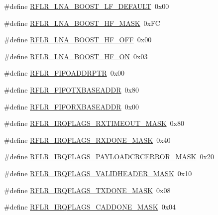 \begin{DoxyCompactItemize}
\#define \mbox{\hyperlink{sx1276_regs-_lo_ra_8h_a952b2dd390b6b2faff709e9950c7bdbf}{R\+F\+L\+R\+\_\+\+L\+N\+A\+\_\+\+B\+O\+O\+S\+T\+\_\+\+L\+F\+\_\+\+D\+E\+F\+A\+U\+LT}}~0x00
\item 
\#define \mbox{\hyperlink{sx1276_regs-_lo_ra_8h_a0276e7bb160dc7aeb54faf11570caee6}{R\+F\+L\+R\+\_\+\+L\+N\+A\+\_\+\+B\+O\+O\+S\+T\+\_\+\+H\+F\+\_\+\+M\+A\+SK}}~0x\+FC
\item 
\#define \mbox{\hyperlink{sx1276_regs-_lo_ra_8h_ab97ab7086b3dd953fa82bcf76347f433}{R\+F\+L\+R\+\_\+\+L\+N\+A\+\_\+\+B\+O\+O\+S\+T\+\_\+\+H\+F\+\_\+\+O\+FF}}~0x00
\item 
\#define \mbox{\hyperlink{sx1276_regs-_lo_ra_8h_af8786c60c42323ea89f1c133e9d82c43}{R\+F\+L\+R\+\_\+\+L\+N\+A\+\_\+\+B\+O\+O\+S\+T\+\_\+\+H\+F\+\_\+\+ON}}~0x03
\item 
\#define \mbox{\hyperlink{sx1276_regs-_lo_ra_8h_a293258103cd0271149fc3ddbc2eb37a2}{R\+F\+L\+R\+\_\+\+F\+I\+F\+O\+A\+D\+D\+R\+P\+TR}}~0x00
\item 
\#define \mbox{\hyperlink{sx1276_regs-_lo_ra_8h_ace89be0e3d72b0aa238de31aa1840fd3}{R\+F\+L\+R\+\_\+\+F\+I\+F\+O\+T\+X\+B\+A\+S\+E\+A\+D\+DR}}~0x80
\item 
\#define \mbox{\hyperlink{sx1276_regs-_lo_ra_8h_af2f960ed320739991501681945e45b7e}{R\+F\+L\+R\+\_\+\+F\+I\+F\+O\+R\+X\+B\+A\+S\+E\+A\+D\+DR}}~0x00
\item 
\#define \mbox{\hyperlink{sx1276_regs-_lo_ra_8h_ab60607459cabba892de2c685a14786ff}{R\+F\+L\+R\+\_\+\+I\+R\+Q\+F\+L\+A\+G\+S\+\_\+\+R\+X\+T\+I\+M\+E\+O\+U\+T\+\_\+\+M\+A\+SK}}~0x80
\item 
\#define \mbox{\hyperlink{sx1276_regs-_lo_ra_8h_aaed938b05c39afb8a66f7abc7bd31a9e}{R\+F\+L\+R\+\_\+\+I\+R\+Q\+F\+L\+A\+G\+S\+\_\+\+R\+X\+D\+O\+N\+E\+\_\+\+M\+A\+SK}}~0x40
\item 
\#define \mbox{\hyperlink{sx1276_regs-_lo_ra_8h_a4e2618c340d93f8bfd19f8634f7a63b3}{R\+F\+L\+R\+\_\+\+I\+R\+Q\+F\+L\+A\+G\+S\+\_\+\+P\+A\+Y\+L\+O\+A\+D\+C\+R\+C\+E\+R\+R\+O\+R\+\_\+\+M\+A\+SK}}~0x20
\item 
\#define \mbox{\hyperlink{sx1276_regs-_lo_ra_8h_a7d3583b774d3514d985a6f8acb6cd7c7}{R\+F\+L\+R\+\_\+\+I\+R\+Q\+F\+L\+A\+G\+S\+\_\+\+V\+A\+L\+I\+D\+H\+E\+A\+D\+E\+R\+\_\+\+M\+A\+SK}}~0x10
\item 
\#define \mbox{\hyperlink{sx1276_regs-_lo_ra_8h_adeb3e1c7ad35e4b4ab4ea7cd9050c2e6}{R\+F\+L\+R\+\_\+\+I\+R\+Q\+F\+L\+A\+G\+S\+\_\+\+T\+X\+D\+O\+N\+E\+\_\+\+M\+A\+SK}}~0x08
\item 
\#define \mbox{\hyperlink{sx1276_regs-_lo_ra_8h_a5af8031790e4a1d7c3703fb4f834b21d}{R\+F\+L\+R\+\_\+\+I\+R\+Q\+F\+L\+A\+G\+S\+\_\+\+C\+A\+D\+D\+O\+N\+E\+\_\+\+M\+A\+SK}}~0x04

\end{DoxyCompactItemize}

